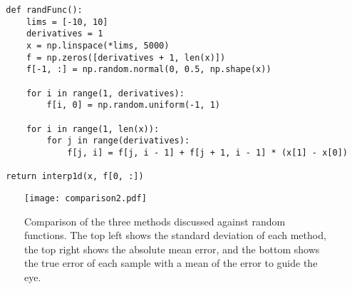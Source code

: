 \lstset{language=Python}
\lstset{frame=lines}
\lstset{basicstyle=\footnotesize}
\begin{lstlisting}
  def randFunc():
      lims = [-10, 10]
      derivatives = 1
      x = np.linspace(*lims, 5000)
      f = np.zeros([derivatives + 1, len(x)])
      f[-1, :] = np.random.normal(0, 0.5, np.shape(x))

      for i in range(1, derivatives):
          f[i, 0] = np.random.uniform(-1, 1)

      for i in range(1, len(x)):
          for j in range(derivatives):
              f[j, i] = f[j, i - 1] + f[j + 1, i - 1] * (x[1] - x[0])

  return interp1d(x, f[0, :])

\end{lstlisting}

\begin{figure}[htbp!] 
  \centering    
  \texttt{[image: comparison2.pdf]}
  \caption[First Comparison]{Comparison of the three methods discussed against random functions. The top left shows the standard deviation of each method, the top right shows the absolute mean error, and the bottom shows the true error of each sample with a mean of the error to guide the eye.}
  \label{fig:betterComparison}
\end{figure}


